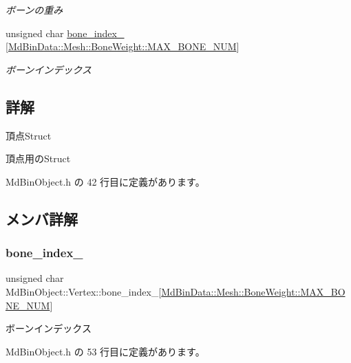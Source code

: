 \begin{DoxyCompactItemize}
\begin{DoxyCompactList}\small\item\em ボーンの重み \end{DoxyCompactList}\item 
unsigned char \mbox{\hyperlink{struct_md_bin_object_1_1_vertex_a49b14e0dee90e220d95ec6246221779b}{bone\+\_\+index\+\_\+}} \mbox{[}\mbox{\hyperlink{class_md_bin_data_1_1_mesh_1_1_bone_weight_a2c870f6c96315b6b9630cff3c24b79e7}{Md\+Bin\+Data\+::\+Mesh\+::\+Bone\+Weight\+::\+M\+A\+X\+\_\+\+B\+O\+N\+E\+\_\+\+N\+UM}}\mbox{]}
\begin{DoxyCompactList}\small\item\em ボーンインデックス \end{DoxyCompactList}\end{DoxyCompactItemize}


\subsection{詳解}
頂点\+Struct 

頂点用の\+Struct 

 Md\+Bin\+Object.\+h の 42 行目に定義があります。



\subsection{メンバ詳解}
\mbox{\label{struct_md_bin_object_1_1_vertex_a49b14e0dee90e220d95ec6246221779b}} 
\subsubsection{\texorpdfstring{bone\+\_\+index\+\_\+}{bone\_index\_}}
{\footnotesize\ttfamily unsigned char Md\+Bin\+Object\+::\+Vertex\+::bone\+\_\+index\+\_\+\mbox{[}\mbox{\hyperlink{class_md_bin_data_1_1_mesh_1_1_bone_weight_a2c870f6c96315b6b9630cff3c24b79e7}{Md\+Bin\+Data\+::\+Mesh\+::\+Bone\+Weight\+::\+M\+A\+X\+\_\+\+B\+O\+N\+E\+\_\+\+N\+UM}}\mbox{]}}



ボーンインデックス 



 Md\+Bin\+Object.\+h の 53 行目に定義があります。

